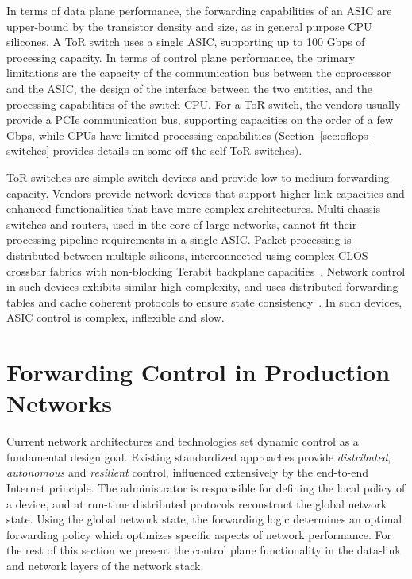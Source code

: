 In terms of data plane performance,  the forwarding capabilities of an ASIC are
upper-bound by the transistor density and size, as in general purpose CPU
silicones. A ToR switch uses a single ASIC, supporting up to 100 Gbps of processing
capacity.  In terms of control plane performance, the primary limitations are the
capacity of the communication bus between the coprocessor and the ASIC, the
design of the interface between the two entities, and the processing capabilities
of the switch CPU\@.  For a ToR switch, the vendors usually provide a PCIe
communication bus, supporting capacities on the order of a few Gbps, while
CPUs have limited processing capabilities (Section~\ref{sec:oflops-switches} provides details
on some off-the-self ToR switches).

ToR switches are simple switch devices and provide low to medium forwarding
capacity. Vendors provide network devices that support higher link capacities
and enhanced functionalities that have more complex architectures.
Multi-chassis switches and routers, used in the core of large networks, cannot
fit their processing pipeline requirements in a single ASIC\@.  Packet
processing is distributed between multiple silicons, interconnected using
complex CLOS crossbar fabrics with non-blocking Terabit backplane
capacities~. Network control in such devices exhibits
similar high complexity, and uses distributed forwarding tables and cache
coherent protocols to ensure state consistency~. In such
devices, ASIC control is complex, inflexible and slow.  

\section{Forwarding Control in Production Networks} \label{sec:background:netcontrol}

Current network architectures and technologies set dynamic control as a
fundamental design goal.  Existing standardized approaches provide
\textit{distributed}, \textit{autonomous} and \textit{resilient} control,
influenced extensively by the end-to-end Internet principle. The administrator
is responsible for defining the local policy of a device, and at run-time
distributed protocols reconstruct the global network state.  Using the global
network state, the forwarding logic determines an optimal forwarding policy
which optimizes specific aspects of network performance.  For the rest of this
section we present the control plane functionality in the data-link and network
layers of the network stack. 

